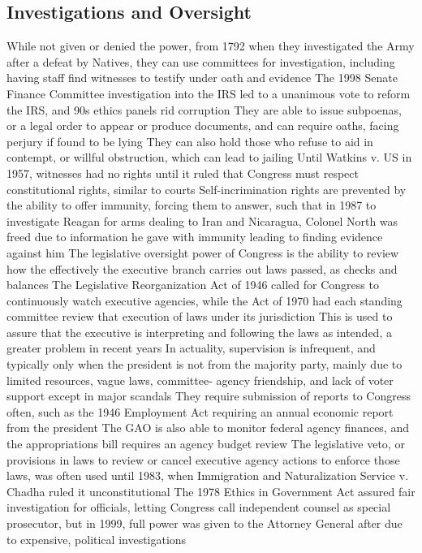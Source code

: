 \documentclass[11 pt, twoside]{article}
\newenvironment{outline*}
{
	\begin{outline}[enumerate]
	}
	{\end{outline}
}
\begin{document}
\subsection{Investigations and Oversight}
\begin{outline*}
\1 While not given or denied the power, from 1792 when they investigated the Army after a defeat by Natives, they can use committees for investigation, including having staff find witnesses to testify under oath and evidence
\2 The 1998 Senate Finance Committee investigation into the IRS led to a unanimous vote to reform the IRS, and 90s ethics panels rid corruption
\1 They are able to issue subpoenas, or a legal order to appear or produce documents, and can require oaths, facing perjury if found to be lying
\2 They can also hold those who refuse to aid in contempt, or willful obstruction, which can lead to jailing
\2 Until Watkins v. US in 1957, witnesses had no rights until it ruled that Congress must respect constitutional rights, similar to courts
\2 Self-incrimination rights are prevented by the ability to offer immunity, forcing them to answer, such that in 1987 to investigate Reagan for arms dealing to Iran and Nicaragua, Colonel North was freed due to information he gave with immunity leading to finding evidence against him
\1 The legislative oversight power of Congress is the ability to review how the effectively the executive branch carries out laws passed, as checks and balances
\2 The Legislative Reorganization Act of 1946 called for Congress to continuously watch executive agencies, while the Act of 1970 had each standing committee review that execution of laws under its jurisdiction
\2 This is used to assure that the executive is interpreting and following the laws as intended, a greater problem in recent years
\1 In actuality, supervision is infrequent, and typically only when the president is not from the majority party, mainly due to limited resources, vague laws, committee- agency friendship, and lack of voter support except in major scandals
\2 They require submission of reports to Congress often, such as the 1946 Employment Act requiring an annual economic report from the president
\2 The GAO is also able to monitor federal agency finances, and the appropriations bill requires an agency budget review
\2 The legislative veto, or provisions in laws to review or cancel executive agency actions to enforce those laws, was often used until 1983, when Immigration and Naturalization Service v. Chadha ruled it unconstitutional
\1 The 1978 Ethics in Government Act assured fair investigation for officials, letting Congress call independent counsel as special prosecutor, but in 1999, full power was given to the Attorney General after due to expensive, political investigations
\end{outline*}
\end{document}
